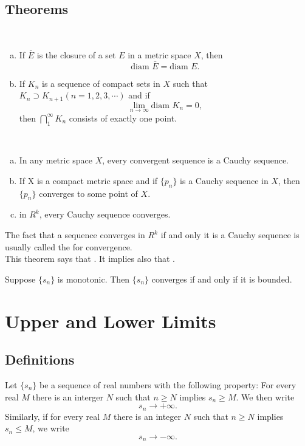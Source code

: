 \subsection{Theorems}
\begin{theorem}
	~
	\begin{enumerate}[(a)]
		\item If $\bar E$ is the closure of a set $E$ in a metric space $X$, then $$\text{diam } \bar E = \text{diam }E.$$
		\item If $K_n$ is a sequence of compact sets in $X$ such that $K_n \supset K_{n+1} (n=1,2,3,\cdots)$ and if $$\lim_{n \to \infty} \text{diam } K_n =0,$$ then $\bigcap_1^\infty K_n$ consists of exactly one point.
	\end{enumerate}
\end{theorem}

\begin{theorem}
	~
	\begin{enumerate}[(a)]
		\item In any metric space $X$, every convergent sequence is a Cauchy sequence.
		\item If X is a compact metric space and if $\{p_n\}$ is a Cauchy sequence in $X$, then $\{p_n\}$ converges to some point of $X$.
		\item in $R^k$, every Cauchy sequence converges.
	\end{enumerate}
	The fact that a sequence converges in $R^k$ if and only it is a Cauchy sequence is usually called the {} for convergence.\\
	This theorem says that {}. It implies also that {}.  
\end{theorem}

\begin{theorem}
	Suppose $\{s_n\}$ is monotonic. Then $\{s_n\}$ converges if and only if it is bounded.
\end{theorem}

\section{Upper and Lower Limits}
\subsection{Definitions}
\begin{definition}
	Let $\{s_n\}$ be a sequence of real numbers with the following property: For every real $M$ there is an interger $N$ such that $n\geq N$ implies $s_n \geq M$. We then write $$s_n\to+\infty.$$ Similarly, if for every real $M$ there is an integer $N$ such that $n\geq N$ implies $s_n\leq M$, we write $$s_n\to-\infty.$$
\end{definition}

